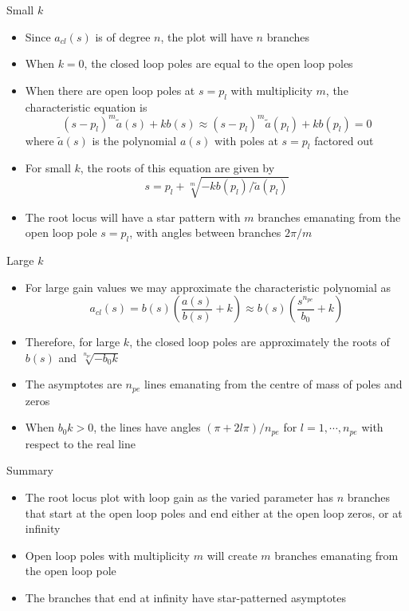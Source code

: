 \documentclass{beamer-control}
\begin{document}
\begin{frame}{Small $k$}
	\begin{itemize}
		\item Since $a_{cl}(s)$ is of degree $n$, the plot will have $n$ branches
		\item When $k=0$, the closed loop poles are equal to the open loop poles
		\item When there are open loop poles at $s=p_l$ with multiplicity $m$, the characteristic equation is 
		\[(s-p_l)^m\tilde{a}(s) + kb(s)\approx (s-p_l)^m\tilde{a}(p_l)+kb(p_l)=0\]
		where $\tilde{a}(s)$ is the polynomial $a(s)$ with poles at $s=p_l$ factored out
		\item For small $k$, the roots of this equation are given by 
		\[s=p_l + \sqrt[m]{-kb(p_l)/\tilde{a}(p_l)}\]
		\item The root locus will have a star pattern with $m$ branches emanating from the open loop pole $s=p_l$, with angles between branches $2\pi/m$
	\end{itemize}
\end{frame}

\begin{frame}{Large $k$}
	\begin{itemize}
		\item For large gain values we may approximate the characteristic polynomial as
		\[a_{cl}(s) = b(s)\left(\frac{a(s)}{b(s)}+k \right) \approx b(s)\left(\frac{s^{n_{pe}}}{b_0}+k \right)\]
		\item Therefore, for large $k$, the closed loop poles are approximately the roots of $b(s)$ and $\sqrt[n_{pe}]{-b_0k}$
		\item The asymptotes are $n_{pe}$ lines emanating from the centre of mass of poles and zeros
		\item When $b_0k>0$, the lines have angles $(\pi+2l\pi)/n_{pe}$ for $l=1,\cdots,n_{pe}$ with respect to the real line
	\end{itemize}
\end{frame}

\begin{frame}{Summary}
\begin{itemize}
	\item The root locus plot with loop gain as the varied parameter has $n$ branches that start at the open loop poles and end either at the open loop zeros, or at infinity
	\item Open loop poles with multiplicity $m$ will create $m$ branches emanating from the open loop pole
	\item The branches that end at infinity have star-patterned asymptotes
	
\end{itemize}
\end{frame}
\end{document}
